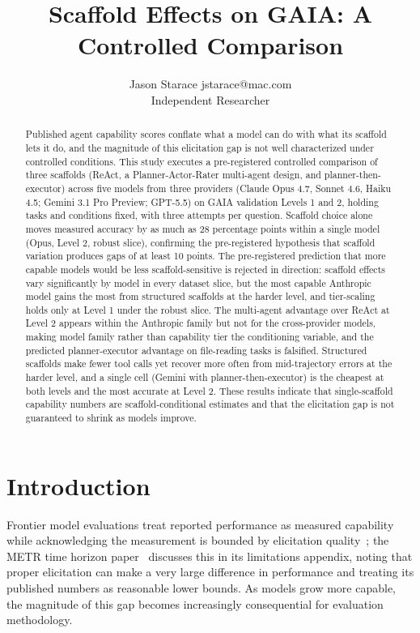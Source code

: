 \documentclass[10pt]{article} %
\title{Scaffold Effects on GAIA: A Controlled Comparison}
\author{\name Jason Starace \email jstarace@mac.com \\
      \addr Independent Researcher
}
\begin{document}
\maketitle

\begin{abstract}
    Published agent capability scores conflate what a model can do with what its scaffold lets it do, and the magnitude of this elicitation gap is not well characterized under controlled conditions. This study executes a pre-registered controlled comparison of three scaffolds (ReAct, a Planner-Actor-Rater multi-agent design, and planner-then-executor) across five models from three providers (Claude Opus 4.7, Sonnet 4.6, Haiku 4.5; Gemini 3.1 Pro Preview; GPT-5.5) on GAIA validation Levels 1 and 2, holding tasks and conditions fixed, with three attempts per question. Scaffold choice alone moves measured accuracy by as much as 28 percentage points within a single model (Opus, Level 2, robust slice), confirming the pre-registered hypothesis that scaffold variation produces gaps of at least 10 points. The pre-registered prediction that more capable models would be less scaffold-sensitive is rejected in direction: scaffold effects vary significantly by model in every dataset slice, but the most capable Anthropic model gains the most from structured scaffolds at the harder level, and tier-scaling holds only at Level 1 under the robust slice. The multi-agent advantage over ReAct at Level 2 appears within the Anthropic family but not for the cross-provider models, making model family rather than capability tier the conditioning variable, and the predicted planner-executor advantage on file-reading tasks is falsified. Structured scaffolds make fewer tool calls yet recover more often from mid-trajectory errors at the harder level, and a single cell (Gemini with planner-then-executor) is the cheapest at both levels and the most accurate at Level 2. These results indicate that single-scaffold capability numbers are scaffold-conditional estimates and that the elicitation gap is not guaranteed to shrink as models improve.
\end{abstract}

\section{Introduction}

    Frontier model evaluations treat reported performance as measured capability while acknowledging the measurement is bounded by elicitation quality~\citep{pimpale2025,gringras2026,kapoor2026,barnett2024}; the METR time horizon paper~\citep{kwa2026measuring} discusses this in its limitations appendix, noting that proper elicitation can make a very large difference in performance and treating its published numbers as reasonable lower bounds. As models grow more capable, the magnitude of this gap becomes increasingly consequential for evaluation methodology.
    
\end{document}
